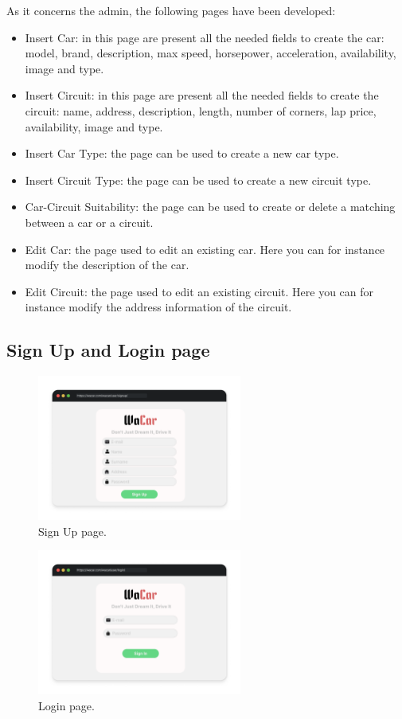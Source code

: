 As it concerns the admin, the following pages have been developed:
\begin{itemize}
    \item Insert Car: in this page are present all the needed fields to create the car: model, brand, description, max speed, horsepower, acceleration, availability, image and type.
    \item Insert Circuit: in this page are present all the needed fields to create the circuit: name, address, description, length, number of corners, lap price, availability, image and type.
    \item Insert Car Type: the page can be used to create a new car type.
    \item Insert Circuit Type: the page can be used to create a new circuit type.
    \item Car-Circuit Suitability: the page can be used to create or delete a matching between a car or a circuit.
    \item Edit Car: the page used to edit an existing car. Here you can for instance modify the description of the car.
    \item Edit Circuit: the page used to edit an existing circuit. Here you can for instance modify the address information of the circuit.
\end{itemize}

\subsection{Sign Up and Login page}

\begin{figure}[h]
  \centering
    \includegraphics[width=0.6\textwidth]{mockup/SignUp.png}
    \caption{Sign Up page.}
    \label{fig:signup}
\end{figure}

\begin{figure}[h]
    \centering
    \includegraphics[width=0.6\textwidth]{mockup/Sign in.png}
    \caption{Login page.}
    \label{fig:signin}
\end{figure}

